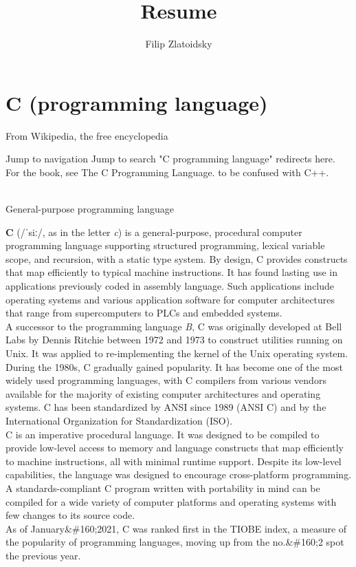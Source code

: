 \documentclass{article}\usepackage{titlesec}
\title{Resume}
\author{Filip Zlatoidsky}
\begin{document}
	
	
	
	
	\section{C (programming language)}
	
		From Wikipedia, the free encyclopedia
		
		
		
		
		Jump to navigation
		Jump to search
		"C programming language" redirects here. For the book, see The C Programming Language.
\itemNot to be confused with C++.

\\

General-purpose programming language

\textbf{C} (/ˈsiː/, as in the letter \emph{c}) is a general-purpose, procedural computer programming language supporting structured programming, lexical variable scope, and recursion, with a static type system. By design, C provides constructs that map efficiently to typical machine instructions. It has found lasting use in applications previously coded in assembly language. Such applications include operating systems and various application software for computer architectures that range from supercomputers to PLCs and embedded systems.
\\
A successor to the programming language \emph{B}, C was originally developed at Bell Labs by Dennis Ritchie between 1972 and 1973 to construct utilities running on Unix. It was applied to re-implementing the kernel of the Unix operating system. During the 1980s, C gradually gained popularity. It has become one of the most widely used programming languages, with C compilers from various vendors available for the majority of existing computer architectures and operating systems. C has been standardized by ANSI since 1989 (ANSI C) and by the International Organization for Standardization (ISO).
\\
C is an imperative procedural language. It was designed to be compiled to provide low-level access to memory and language constructs that map efficiently to machine instructions, all with minimal runtime support. Despite its low-level capabilities, the language was designed to encourage cross-platform programming. A standards-compliant C program written with portability in mind can be compiled for a wide variety of computer platforms and operating systems with few changes to its source code.
\\
As of January&\#160;2021, C was ranked first in the TIOBE index, a measure of the popularity of programming languages, moving up from the no.&\#160;2 spot the previous year.
\\
\end{document}
